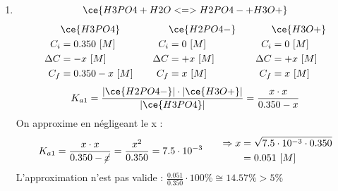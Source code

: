 \documentclass[
  11pt,
  french,
  a4paper,
  openany]{book}
\providecommand{\tightlist}{%
  \setlength{\itemsep}{0pt}\setlength{\parskip}{0pt}}
\begin{document}
\begin{Answer}

\begin{enumerate}
\def\labelenumi{\alph{enumi}.}
\tightlist
\item
  \[
  \ce{H3PO4 + H2O <=> H2PO4- + H3O+}
  \]
  \[
  \begin{split}
  &\ce{H3PO4}\\
  C_i &= 0.350\ [M] \\
  \Delta C &= - x\ [M] \\
  C_f &= 0.350 - x\ [M] \\
  \end{split}
  \qquad
  \begin{split}
  &\ce{H2PO4-}\\
  C_i &= 0\ [M] \\
  \Delta C &= + x\ [M] \\
  C_f &= x\ [M] \\
  \end{split}
  \qquad
  \begin{split}
  &\ce{H3O+}\\
  C_i &= 0\ [M] \\
  \Delta C &= + x\ [M] \\
  C_f &= x\ [M] \\
  \end{split}
  \]
  \[
  K_{a1} = \frac{|\ce{H2PO4-}| \cdot |\ce{H3O+}|}{|\ce{H3PO4}|} = \frac{x \cdot x}{0.350 - x}
  \]
  On approxime en négligeant le x :
  \[
  \begin{split}
  K_{a1} = \frac{x \cdot x}{0.350 - \cancel{x}} = \frac{x^2}{0.350} = 7.5 \cdot 10^{-3}
  \end{split}
  \qquad
  \begin{split}
  \Rightarrow x &= \sqrt{7.5 \cdot 10^{-3} \cdot 0.350} \\
    &= 0.051\ [M]
  \end{split}
  \]
  L'approximation n'est pas valide : \(\frac{0.051}{0.350} \cdot 100\% \cong 14.57\% > 5\%\)
\end{enumerate}


\end{Answer}
\end{document}
